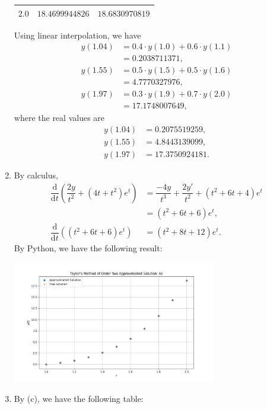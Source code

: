 \documentclass[11pt]{article}
\theoremstyle{break}
\newcommand{\dd}{\text{d}}
\numberwithin{equation}{theorem}
\begin{document}
\begin{enumerate}
\begin{center}
\begin{tabular}{|c|c|c|}
            \hline
            $2.0$ & $18.4699944826$ & $18.6830970819$ \\
            \hline
        \end{tabular}
    \end{center}
    Using linear interpolation, we have 
    \begin{align*}
        y(1.04)&=0.4\cdot y(1.0)+0.6\cdot y(1.1)\\
        &=0.2038711371,\\
        y(1.55)&=0.5\cdot y(1.5)+0.5\cdot y(1.6)\\
        &=4.7770327976,\\
        y(1.97)&=0.3\cdot y(1.9)+0.7\cdot y(2.0)\\
        &=17.1748007649,
    \end{align*}
    where the real values are
    \begin{align*}
        y(1.04)&=0.2075519259,\\
        y(1.55)&=4.8443139099,\\
        y(1.97)&=17.3750924181.
    \end{align*}
    \item By calculus, \begin{align*}
        \dfrac{\dd}{\dd t}\left(\dfrac{2y}{t^2}+(4t+t^2)e^t\right)&=\dfrac{-4y}{t^3}+\dfrac{2y'}{t^2}+(t^2+6t+4)e^t\\
        &=(t^2+6t+6)e^t,\\
        \dfrac{\dd}{\dd t}\left((t^2+6t+6)e^t\right)&=(t^2+8t+12)e^t.
    \end{align*}
    By Python, we have the following result:
    \begin{center}
        \includegraphics[width=0.7\textwidth]{P6c.png}
    \end{center}
    \item By (c), we have the following table:
    \begin{center}
        \begin{tabular}{|c|c|c|}

\end{tabular}
\end{center}
\end{enumerate}
\end{document}
